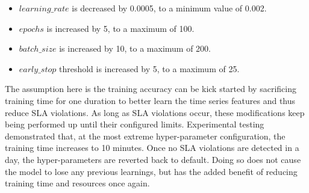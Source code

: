 \begin{itemize}
    \item $learning\_rate$ is decreased by 0.0005, to a minimum value of 0.002.
    \item $epochs$ is increased by 5, to a maximum of 100.
    \item $batch\_size$ is increased by 10, to a maximum of 200.
    \item $early\_stop$ threshold is increased by 5, to a maximum of 25.
\end{itemize}

The assumption here is the training accuracy can be kick started by sacrificing training time for one duration to better learn the time series features and thus reduce SLA violations. As long as SLA violations occur, these modifications keep being performed up until their configured limits. Experimental testing demonstrated that, at the most extreme hyper-parameter configuration, the training time increases to 10 minutes. Once no SLA violations are detected in a day, the hyper-parameters are reverted back to default. Doing so does not cause the model to lose any previous learnings, but has the added benefit of reducing training time and resources once again.